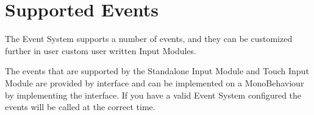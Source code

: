 \chapter{Supported Events}
\hypertarget{md__library_2_package_cache_2com_8unity_8ugui_0d1_80_80_2_documentation_0i_2_supported_events}{}\label{md__library_2_package_cache_2com_8unity_8ugui_0d1_80_80_2_documentation_0i_2_supported_events}
\label{md__library_2_package_cache_2com_8unity_8ugui_0d1_80_80_2_documentation_0i_2_supported_events_autotoc_md1457}%
%
 The Event System supports a number of events, and they can be customized further in user custom user written Input Modules.

The events that are supported by the Standalone Input Module and Touch Input Module are provided by interface and can be implemented on a Mono\+Behaviour by implementing the interface. If you have a valid Event System configured the events will be called at the correct time.


